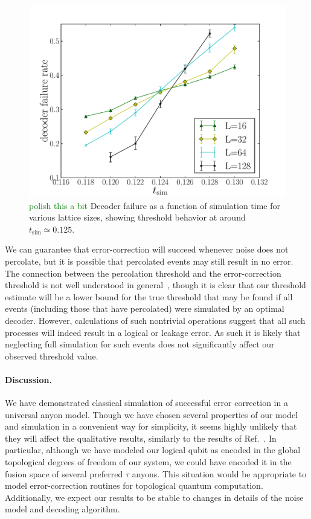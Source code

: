 \documentclass[aps, prl, letterpaper, twocolumn, superscriptaddress, notitlepage, 10pt]{revtex4-1}
\newcommand{\stf}[1]{\textcolor{green}{#1}}
\begin{document}
\begin{figure}[th!]
\begin{center}
	\includegraphics[width=\columnwidth]{anyons-kyle.pdf}
\caption{\stf{polish this a bit} Decoder failure as a function of simulation time for various lattice sizes, showing 
threshold behavior at around $t_{\mathrm{sim}}\simeq 0.125$.}
\label{f:threshold}
\end{center}
\end{figure}

We can guarantee that error-correction will succeed whenever noise does not percolate, but it is possible that percolated events may still result in no error. 
The connection between the percolation threshold and the error-correction threshold is not well understood in general~\cite{Hastings2014}, though it is clear that our threshold estimate will be a lower bound for the true threshold that may be found if all events (including those that have percolated) were simulated by an optimal decoder. 
However, calculations of such nontrivial operations suggest that all such processes will indeed result in a logical or leakage error.
As such it is likely that neglecting full simulation for such events does not significantly affect our observed threshold value.

\paragraph{Discussion.}

We have demonstrated classical simulation of successful error correction in a universal anyon model. 
Though we have chosen several properties of our model and simulation in a convenient way for simplicity, it seems highly unlikely that they will affect the qualitative results, similarly to the results of Ref.~\cite{Brell2013}. 
In particular, although we have modeled our logical qubit as encoded in the global topological degrees of freedom of our system, we could have encoded it in the fusion space of several preferred $\tau$ anyons. 
This situation would be appropriate to model error-correction routines for topological quantum computation. 
Additionally, we expect our results to be stable to changes in details of the noise model and decoding algorithm.
\end{document}
